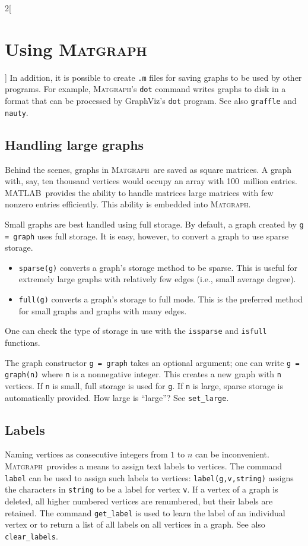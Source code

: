 \documentclass{amsart}
\newcommand\matlab{MATLAB}
\newcommand\matgraph{\textsc{Matgraph}}
\begin{document}
\begin{multicols}{2}[\section{Using \matgraph}]
In addition, it is possible to create \verb|.m| files for saving
graphs to be used by other programs. For example, \matgraph's
\verb|dot| command writes graphs to disk in a format that can be
processed by GraphViz's \verb|dot| program. See also \verb|graffle|
and \verb|nauty|. 


\subsection{Handling large graphs}
\label{subsect:large}

Behind the scenes, graphs in \matgraph\ are saved as square matrices.
A graph with, say, ten thousand vertices would occupy an array with
100~million entries. \matlab\ provides the ability to handle matrices
large matrices with few nonzero entries efficiently. This ability is
embedded into \matgraph.

Small graphs are best handled using full storage. By default, a
graph created by \verb|g = graph| uses full storage. It is easy,
however, to convert a graph to use sparse storage.

\begin{itemize}
\item \verb|sparse(g)| converts a graph's storage method to be
  sparse. This is useful for extremely large graphs with relatively
  few edges (i.e., small average degree).

\item \verb|full(g)| converts a graph's storage to full mode. This is
  the preferred method for small graphs and graphs with many edges.
\end{itemize}

One can check the type of storage in use with the \verb|issparse| and
\verb|isfull| functions.

\smallbreak

The graph constructor \verb|g = graph| takes an optional argument; one
can write \verb|g = graph(n)| where \verb|n| is a nonnegative
integer. This creates a new graph with \verb|n| vertices. If \verb|n|
is small, full storage is used for \verb|g|. If \verb|n| is large,
sparse storage is automatically provided. How large is ``large''? See
\verb|set_large|. 


\subsection{Labels}

Naming vertices as consecutive integers from $1$ to $n$ can be
inconvenient. \matgraph\ provides a means to assign text labels to
vertices. The command \verb|label| can be used to assign such labels
to vertices: \verb|label(g,v,string)| assigns the characters in
\verb|string| to be a label for vertex \verb|v|. If a vertex of a
graph is deleted, all higher numbered vertices are renumbered, but
their labels are retained. The command \verb|get_label| is used to
learn the label of an individual vertex or to return a list of all
labels on all vertices  in a graph. See also \verb|clear_labels|.




\end{multicols}
\end{document}
